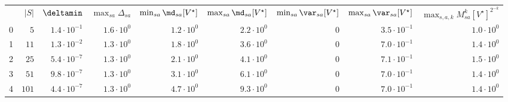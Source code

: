 \begin{tabular}{lrrrrrrrr}
 & $|S|$ & $\deltamin$ & $\max_{sa} \Delta_{sa}$ & $\min_{sa} \md_{sa}[V^\star]$ & $\max_{sa} \md_{sa}[V^\star]$ & $\min_{sa} \var_{sa}[V^\star]$ & $\max_{sa} \var_{sa}[V^\star]$ & $\max_{s,a,k} M_{sa}^k[V^\star]^{2^{-k}}$ \\
0 & $5$ & $1.4\cdot 10^{-1}$ & $1.6\cdot 10^{0}$ & $1.2\cdot 10^{0}$ & $2.2\cdot 10^{0}$ & $0$ & $3.5\cdot 10^{-1}$ & $1.0\cdot 10^{0}$ \\
1 & $11$ & $1.3\cdot 10^{-2}$ & $1.3\cdot 10^{0}$ & $1.8\cdot 10^{0}$ & $3.6\cdot 10^{0}$ & $0$ & $7.0\cdot 10^{-1}$ & $1.4\cdot 10^{0}$ \\
2 & $25$ & $5.4\cdot 10^{-7}$ & $1.3\cdot 10^{0}$ & $2.1\cdot 10^{0}$ & $4.1\cdot 10^{0}$ & $0$ & $7.1\cdot 10^{-1}$ & $1.5\cdot 10^{0}$ \\
3 & $51$ & $9.8\cdot 10^{-7}$ & $1.3\cdot 10^{0}$ & $3.1\cdot 10^{0}$ & $6.1\cdot 10^{0}$ & $0$ & $7.0\cdot 10^{-1}$ & $1.4\cdot 10^{0}$ \\
4 & $101$ & $4.4\cdot 10^{-7}$ & $1.3\cdot 10^{0}$ & $4.7\cdot 10^{0}$ & $9.3\cdot 10^{0}$ & $0$ & $7.0\cdot 10^{-1}$ & $1.4\cdot 10^{0}$ \\
\end{tabular}
